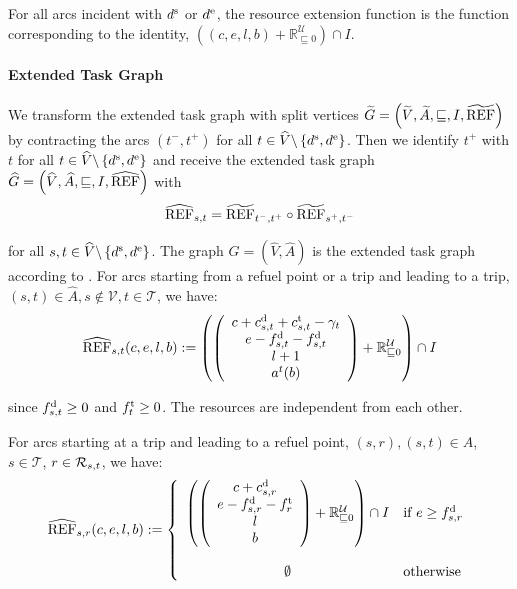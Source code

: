 For all arcs incident with $d^{\operatorname{s}}$ or $d^{\operatorname{e}}$, the resource extension function is the function corresponding to the identity, \ie ${\left((c,e,l,b)+\mathbb{R}^{\mathcal{U}}_{\sqsubseteq 0}\right)\cap I}$.

\paragraph{Extended Task Graph} \parfill

We transform the extended task graph with split vertices ${\widetilde{G}=\left(\widetilde{V},\widetilde{A},\sqsubseteq,I,\widetilde{\operatorname{REF}}\right)}$ by contracting the arcs $\left(t^-,t^+\right)$ for all $t\in\widehat{V}\backslash\left\{d^{\operatorname{s}},d^{\operatorname{e}}\right\}$. Then we identify $t^+$ with $t$ for all $t\in\widehat{V}\backslash\left\{d^{\operatorname{s}},d^{\operatorname{e}}\right\}$ and receive the extended task graph ${\widehat{G}=\left(\widehat{V},\widehat{A},\sqsubseteq,I,\widehat{\operatorname{REF}}\right)}$ with
\begin{align*}
	\widehat{\operatorname{REF}}_{s,t} = \widetilde{\operatorname{REF}}_{t^-,t^+}\circ\widetilde{\operatorname{REF}}_{s^+,t^-}
\end{align*}

for all $s,t\in\widehat{V}\backslash\left\{d^{\operatorname{s}},d^{\operatorname{e}}\right\}$. The graph ${\widehat{G}=\left(\widehat{V},\widehat{A}\right)}$ is the extended task graph according to . For arcs starting from a refuel point or a trip and leading to a trip, \ie ${(s,t)\in\widehat{A},s\notin\mathcal{V},t\in\mathcal{T}}$, we have:
\begin{align*}
	\widehat{\operatorname{REF}}_{s,t}(c,e,l,b) := \left(\left(
	\begin{array}{c}
		c + c^{\operatorname{d}}_{s,t} + c^{\operatorname{t}}_{s,t} - \gamma_t \\ e - f^{\operatorname{d}}_{s,t} - f^{\operatorname{d}}_{s,t} \\ l + 1 \\ a^t(b)
	\end{array}
	\right) + \mathbb{R}^{\mathcal{U}}_{\sqsubseteq 0}\right) \cap I
\end{align*}

since $f^{\operatorname{d}}_{s,t}\geq 0$ and $f^{\operatorname{t}}_t\geq 0$. The resources are independent from each other.

For arcs starting at a trip and leading to a refuel point, \ie ${(s,r),(s,t)\in A}$, ${s\in\mathcal{T}}$, ${r\in\mathcal{R}_{s,t}}$, we have:
\begin{align*}
	\widehat{\operatorname{REF}}_{s,r}(c,e,l,b) := \left\{ \begin{array}{cl}
		\left(\left( \begin{array}{c}
			c + c^{\operatorname{d}}_{s,r} \\ e - f^{\operatorname{d}}_{s,r} - f^{\operatorname{t}}_r \\ l \\ b
		\end{array} \right) + \mathbb{R}^{\mathcal{U}}_{\sqsubseteq 0}\right) \cap I & \text{if } e\geq f^{\operatorname{d}}_{s,r} \\
		\\
		\emptyset & \text{otherwise}
	\end{array} \right.
\end{align*}

